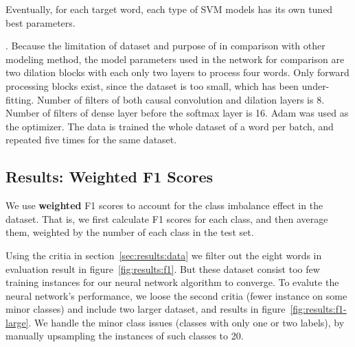 Eventually, for each target word, each type of SVM models has its own tuned best
parameters.

.
Because the limitation of dataset and purpose of in comparison with other modeling method, the model parameters used in the network for comparison are two dilation blocks with each only two layers to process four words. Only forward processing blocks exist, since the dataset is too small, which has been under-fitting. Number of filters of both causal convolution and dilation layers is 8. Number of filters of dense layer before the softmax layer is 16. Adam was used as the optimizer. The data is trained the whole dataset of a word per batch, and repeated five times for the same dataset. 

\subsection{Results: Weighted F1 Scores}
\label{sec:eval:results}

We use \textbf{weighted} F1 scores to account for the class imbalance effect in
the dataset. 
That is, we first calculate F1 scores for each class, and then average them,
weighted by the number of each class in the test set.

Using the critia in section~\ref{sec:results:data} we filter out the eight words
in evaluation result in figure~\ref{fig:results:f1}.
But these dataset consist too few training instances for our neural network
algorithm to converge.
To evalute the neural network's performance, we loose the second critia (fewer
instance on some minor classes) and include two larger dataset, and results in
figure~\ref{fig:results:f1-large}.
We handle the minor class issues (classes with only one or two labels), by
manually upsampling the instances of such classes to 20.

